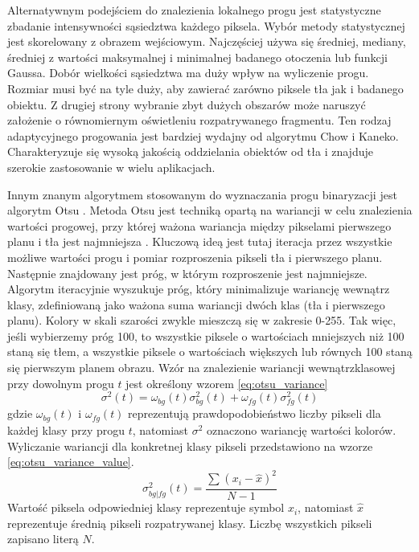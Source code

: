 Alternatywnym podejściem do znalezienia lokalnego progu jest statystyczne zbadanie intensywności sąsiedztwa każdego piksela.
Wybór metody statystycznej jest skorelowany z obrazem wejściowym.
Najczęściej używa się średniej, mediany, średniej z wartości maksymalnej i minimalnej badanego otoczenia lub funkcji Gaussa.
Dobór wielkości sąsiedztwa ma duży wpływ na wyliczenie progu.
Rozmiar musi być na tyle duży, aby zawierać zarówno piksele tła jak i badanego obiektu.
Z drugiej strony wybranie zbyt dużych obszarów może naruszyć założenie o równomiernym oświetleniu rozpatrywanego fragmentu.
Ten rodzaj adaptycyjnego progowania jest bardziej wydajny od algorytmu Chow i Kaneko.
Charakteryzuje się wysoką jakością oddzielania obiektów od tła i znajduje szerokie zastosowanie w wielu aplikacjach.

Innym znanym algorytmem stosowanym do wyznaczania progu binaryzacji jest algorytm Otsu \cite{4310076}.
Metoda Otsu jest techniką opartą na wariancji w celu znalezienia wartości progowej, przy której ważona wariancja między pikselami pierwszego planu i tła jest najmniejsza \cite{otsu_article}.
Kluczową ideą jest tutaj iteracja przez wszystkie możliwe wartości progu i pomiar rozproszenia pikseli tła i pierwszego planu.
Następnie znajdowany jest próg, w którym rozproszenie jest najmniejsze.
Algorytm iteracyjnie wyszukuje próg, który minimalizuje wariancję wewnątrz klasy, zdefiniowaną jako ważona suma wariancji dwóch klas (tła i pierwszego planu).
Kolory w skali szarości zwykle mieszczą się w zakresie 0-255.
Tak więc, jeśli wybierzemy próg 100, to wszystkie piksele o wartościach mniejszych niż 100 staną się tłem, a wszystkie piksele o wartościach większych lub równych 100 staną się pierwszym planem obrazu.
Wzór na znalezienie wariancji wewnątrzklasowej przy dowolnym progu $t$ jest określony wzorem \eqref{eq:otsu_variance}
\begin{equation}
    \label{eq:otsu_variance}
    \sigma^2(t)=\omega_{bg}(t)\sigma_{bg}^2(t)+\omega_{fg}(t)\sigma_{fg}^2(t)
\end{equation}
gdzie $\omega_{bg}(t)$ i $\omega_{fg}(t)$ reprezentują prawdopodobieństwo liczby pikseli dla każdej klasy przy progu $t$, natomiast $\sigma^2$ oznaczono wariancję wartości kolorów.
Wyliczanie wariancji dla konkretnej klasy pikseli przedstawiono na wzorze \eqref{eq:otsu_variance_value}.
\begin{equation}
    \label{eq:otsu_variance_value}
    \sigma_{bg | fg}^2(t)=\dfrac{\sum_{}^{}(x_i-\hat{x})^2}{N-1}
\end{equation}
Wartość piksela odpowiedniej klasy reprezentuje symbol $x_i$, natomiast $\hat{x}$ reprezentuje średnią pikseli rozpatrywanej klasy.
Liczbę wszystkich pikseli zapisano literą $N$.

